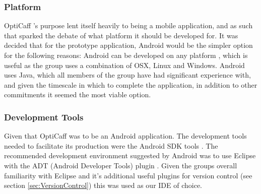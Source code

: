 \subsubsection{Platform}
OptiCaff ’s purpose lent itself heavily to being a mobile application, and as such that sparked the debate of what platform it should be developed for. It was decided that for the prototype application, Android \cite{Android} would be the simpler option for the following reasons:
Android can be developed on any platform \cite{SDKAllOS}, which is useful as the group uses a combination of OSX, Linux and Windows. 
Android uses Java, which all members of the group have had significant experience with, and given the timescale in which to complete the application, in addition to other commitments it seemed the most viable option. 

\subsubsection{Development Tools}
Given that OptiCaff was to be an Android application. The development tools needed to facilitate its production were the Android SDK tools \cite{AndroidSDK}. The recommended development environment suggested by Android was to use Eclipse \cite{Eclipse} with the ADT (Android Developer Tools) plugin \cite{SDKAllOS}. Given the groups overall familiarity with Eclipse and it’s additional useful plugins for version control (see section \ref{sec:VersionControl}) this was used as our IDE of choice.